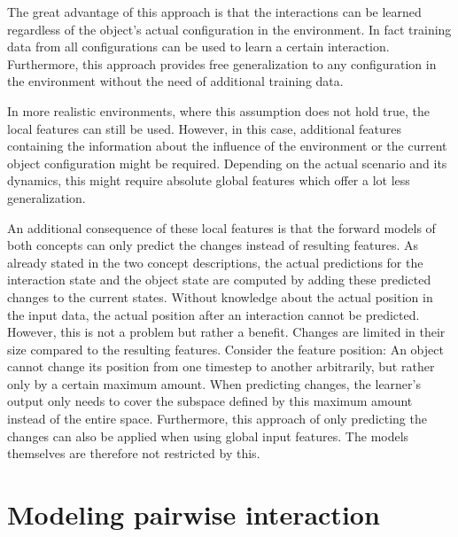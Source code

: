 The great advantage of this approach is that the interactions can be learned regardless of the object's actual configuration in the environment. In fact training data from all configurations can be used to learn a certain interaction. Furthermore, this approach provides free generalization to any configuration in the environment without the need of additional training data.

In more realistic environments, where this assumption does not hold true, the local features can still be used. However, in this case, additional features containing the information about the influence of the environment or the current object configuration might be required. Depending on the actual scenario and its dynamics, this might require absolute global features which offer a lot less generalization.

An additional consequence of these local features is that the forward models of both concepts can only predict the changes instead of resulting features. As already stated in the two concept descriptions, the actual predictions for the interaction state and the object state are computed by adding these predicted changes to the current states.
Without knowledge about the actual position in the input data, the actual position after an interaction cannot be predicted. However, this is not a problem but rather a benefit. Changes are limited in their size compared to the resulting features. 
Consider the feature position: An object cannot change its position from one timestep to another arbitrarily, but rather only by a certain maximum amount. When predicting changes, the learner's output only needs to cover the subspace defined by this maximum amount instead of the entire space. Furthermore, this approach of only predicting the changes can also be applied when using global input features. The models themselves are therefore not restricted by this.


\section{Modeling pairwise interaction \label{sec:pairRealization}}



